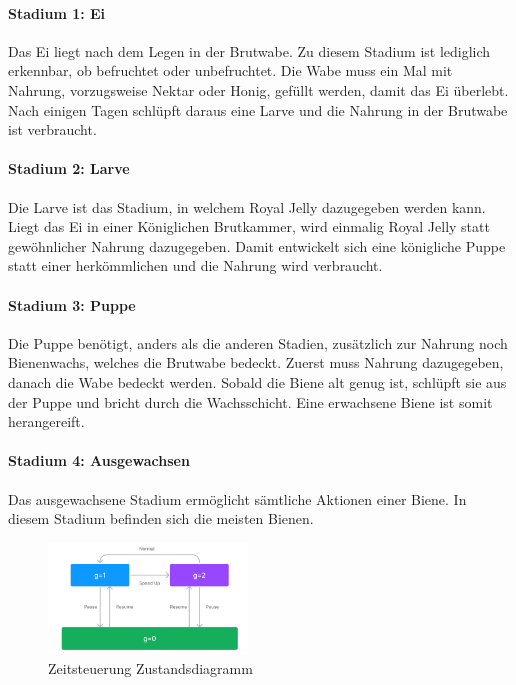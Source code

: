 \paragraph{Stadium 1: Ei} Das Ei liegt nach dem Legen in der Brutwabe. Zu diesem Stadium ist lediglich erkennbar, ob befruchtet oder unbefruchtet. Die Wabe muss ein Mal mit Nahrung, vorzugsweise Nektar oder Honig, gefüllt werden, damit das Ei überlebt. Nach einigen Tagen schlüpft daraus eine Larve und die Nahrung in der Brutwabe ist verbraucht.

\paragraph{Stadium 2: Larve} Die Larve ist das Stadium, in welchem Royal Jelly dazugegeben werden kann. Liegt das Ei in einer Königlichen Brutkammer, wird einmalig Royal Jelly statt gewöhnlicher Nahrung dazugegeben. Damit entwickelt sich eine königliche Puppe statt einer herkömmlichen und die Nahrung wird verbraucht.

\paragraph{Stadium 3: Puppe} Die Puppe benötigt, anders als die anderen Stadien, zusätzlich zur Nahrung noch Bienenwachs, welches die Brutwabe bedeckt. Zuerst muss Nahrung dazugegeben, danach die Wabe bedeckt werden. Sobald die Biene alt genug ist, schlüpft sie aus der Puppe und bricht durch die Wachsschicht. Eine erwachsene Biene ist somit herangereift.

\paragraph{Stadium 4: Ausgewachsen} Das ausgewachsene Stadium ermöglicht sämtliche Aktionen einer Biene. In diesem Stadium befinden sich die meisten Bienen. 

\begin{figure}
    \begin{center}
        \includegraphics[width=200px]{0.bilder/timecontrol.png}
    \end{center}
    \caption{Zeitsteuerung Zustandsdiagramm} \label{image:timecontrol}
\end{figure}


